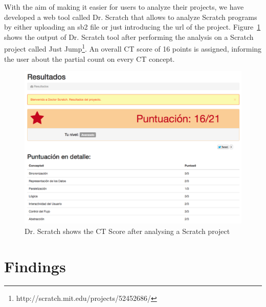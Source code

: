 \documentclass[a4paper,11pt]{article}
\begin{document}
With the aim of making it easier for users to analyze their projects, we have developed a web tool called Dr. Scratch that allows to analyze Scratch programs by either uploading an sb2 file or just introducing the url of the project. Figure~\ref{fig:drscratch} shows the output of Dr. Scratch tool after performing the analysis on a Scratch project called Just Jump\footnote{http://scratch.mit.edu/projects/52452686/}. An overall CT score of 16 points is assigned, informing the user about the partial count on every CT concept.
\begin{figure}
  \centering
    \includegraphics[width=13cm]{img/results.png}
    \caption{Dr. Scratch shows the CT Score after analysing a Scratch project}
    \label{fig:drscratch}
\end{figure}

\section{Findings}
\label{sec:findings}
\end{document}
